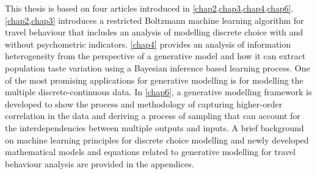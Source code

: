 This thesis is based on four articles introduced in \cref{chap2,chap3,chap4,chap6}. \cref{chap2,chap3} introduces a restricted Boltzmann machine learning algorithm for travel behaviour that includes an analysis of modelling discrete choice with and without psychometric indicators.
\cref{chap4} provides an analysis of information heterogeneity from the perspective of a generative model and how it can extract population taste variation using a Bayesian inference based learning process.
One of the most promising applications for generative modelling is for modelling the multiple discrete-continuous data.
In \cref{chap6}, a generative modelling framework is developed to show the process and methodology of capturing higher-order correlation in the data and deriving a process of sampling that can account for the interdependencies between multiple outputs and inputs.
A brief background on machine learning principles for discrete choice modelling and newly developed mathematical models and equations related to generative modelling for travel behaviour analysis are provided in the appendices.
\clearpage
